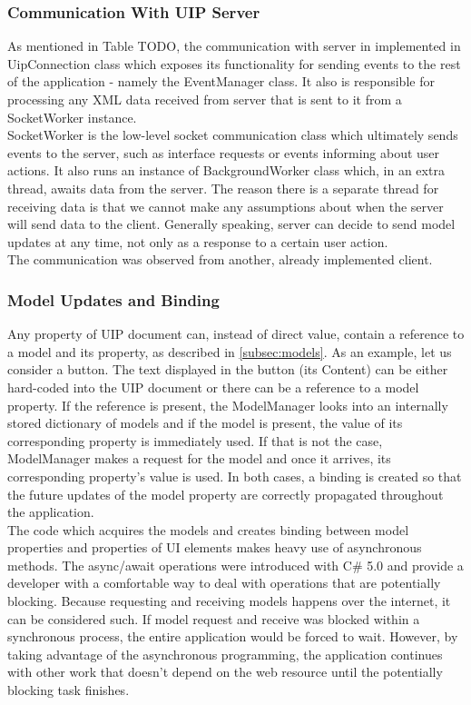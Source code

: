 \subsubsection{Communication With UIP Server}
As mentioned in Table TODO, the communication with server in implemented in UipConnection class which exposes its functionality for sending events to the rest of the application - namely the EventManager class. It also is responsible for processing any XML data received from server that is sent to it from a SocketWorker instance.
\\
SocketWorker is the low-level socket communication class which ultimately sends events to the server, such as interface requests or events informing about user actions. It also runs an instance of BackgroundWorker class which, in an extra thread, awaits data from the server. The reason there is a separate thread for receiving data is that we cannot make any assumptions about when the server will send data to the client. Generally speaking, server can decide to send model updates at any time, not only as a response to a certain user action.\\
The communication was observed from another, already implemented client.

\subsubsection{Model Updates and Binding}
Any property of UIP document can, instead of direct value, contain a reference to a model and its property, as described in \ref{subsec:models}. As an example, let us consider a button. The text displayed in the button (its Content) can be either hard-coded into the UIP document or there can be a reference to a model property. If the reference is present, the ModelManager looks into an internally stored dictionary of models and if the model is present, the value of its corresponding property is immediately used. If that is not the case, ModelManager makes a request for the model and once it arrives, its corresponding property's value is used. In both cases, a binding is created so that the future updates of the model property are correctly propagated throughout the application.\\The code which acquires the models and creates binding between model properties and properties of UI elements makes heavy use of asynchronous methods. The async/await operations were introduced with C\# 5.0  and provide a developer with a comfortable way to deal with operations that are potentially blocking. Because requesting and receiving models happens over the internet, it can be considered such. If model request and receive was blocked within a synchronous process, the entire application would be forced to wait. However, by taking advantage of the asynchronous programming, the application continues with other work that doesn't depend on the web resource until the potentially blocking task finishes.

